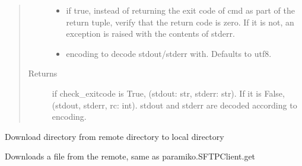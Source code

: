 \documentclass[letterpaper,12pt,english]{sphinxmanual}
\begin{document}
\begin{fulllineitems}
\begin{fulllineitems}
\begin{quote}
\begin{description}
\begin{itemize}
\item {} 
\sphinxAtStartPar
{} \textendash{} if true, instead of returning the exit code of cmd as part of the return tuple, verify
that the return code is zero. If it is not, an exception is raised with the contents of stderr.

\item {} 
\sphinxAtStartPar
{} \textendash{} encoding to decode stdout/stderr with. Defaults to utf\sphinxhyphen{}8.

\end{itemize}

\item[{Returns}] \leavevmode
\sphinxAtStartPar
if check\_exitcode is True, (stdout: str, stderr: str). If it is False, (stdout, stderr, rc: int).
stdout and stderr are decoded according to encoding.

\end{description}\end{quote}

\end{fulllineitems}


\begin{fulllineitems}
\label{\detokenize{PARyOpt.evaluators:PARyOpt.evaluators.connection.Connection.get_dir}}
\sphinxAtStartPar
Download directory from remote directory to local directory

\end{fulllineitems}


\begin{fulllineitems}
\label{\detokenize{PARyOpt.evaluators:PARyOpt.evaluators.connection.Connection.get_file}}
\sphinxAtStartPar
Downloads a file from the remote, same as paramiko.SFTPClient.get


\end{fulllineitems}
\end{fulllineitems}
\end{document}
